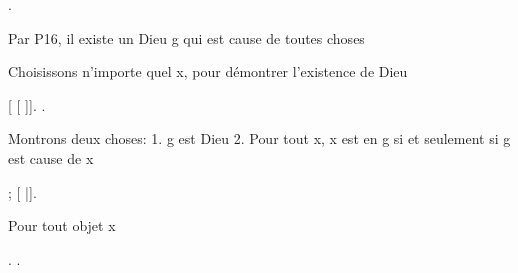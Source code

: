 \documentclass[10pt]{report}
\begin{document}
\begin{coqdoccode}
\coqdocnoindent
{}.\coqdoceol
\coqdocindent{1.00em}
\begin{coqdoccomment}
\coqdocindent{0.50em}
Par\coqdocindent{0.50em}
P16,\coqdocindent{0.50em}
il\coqdocindent{0.50em}
existe\coqdocindent{0.50em}
un\coqdocindent{0.50em}
Dieu\coqdocindent{0.50em}
g\coqdocindent{0.50em}
qui\coqdocindent{0.50em}
est\coqdocindent{0.50em}
cause\coqdocindent{0.50em}
de\coqdocindent{0.50em}
toutes\coqdocindent{0.50em}
choses\coqdocindent{0.50em}
\end{coqdoccomment}
\coqdoceol
\coqdocindent{1.00em}
\begin{coqdoccomment}
\coqdocindent{0.50em}
Choisissons\coqdocindent{0.50em}
n'importe\coqdocindent{0.50em}
quel\coqdocindent{0.50em}
x,\coqdocindent{0.50em}
pour\coqdocindent{0.50em}
démontrer\coqdocindent{0.50em}
l'existence\coqdocindent{0.50em}
de\coqdocindent{0.50em}
Dieu\coqdocindent{0.50em}
\end{coqdoccomment}
\coqdoceol
\coqdocindent{1.00em}
   [ [ \coqdocvar{\_}]].\coqdoceol
\coqdocindent{1.00em}
\coqdoctac{\ensuremath{\exists}} .\coqdoceol
\coqdocemptyline
\coqdocindent{1.00em}
\begin{coqdoccomment}
\coqdocindent{0.50em}
Montrons\coqdocindent{0.50em}
deux\coqdocindent{0.50em}
choses:\coqdoceol
\coqdocindent{2.50em}
1.\coqdocindent{0.50em}
g\coqdocindent{0.50em}
est\coqdocindent{0.50em}
Dieu\coqdoceol
\coqdocindent{2.50em}
2.\coqdocindent{0.50em}
Pour\coqdocindent{0.50em}
tout\coqdocindent{0.50em}
x,\coqdocindent{0.50em}
x\coqdocindent{0.50em}
est\coqdocindent{0.50em}
en\coqdocindent{0.50em}
g\coqdocindent{0.50em}
si\coqdocindent{0.50em}
et\coqdocindent{0.50em}
seulement\coqdocindent{0.50em}
si\coqdocindent{0.50em}
g\coqdocindent{0.50em}
est\coqdocindent{0.50em}
cause\coqdocindent{0.50em}
de\coqdocindent{0.50em}
x\coqdocindent{0.50em}
\end{coqdoccomment}
\coqdoceol
\coqdocindent{1.00em}
; [ |].\coqdoceol
\coqdocemptyline
\coqdocindent{1.00em}
\begin{coqdoccomment}
\coqdocindent{0.50em}
Pour\coqdocindent{0.50em}
tout\coqdocindent{0.50em}
objet\coqdocindent{0.50em}
x\coqdocindent{0.50em}
\end{coqdoccomment}
\coqdoceol
\coqdocindent{1.00em}
 .\coqdoceol
\coqdocindent{1.00em}
.\coqdoceol
\coqdocemptyline
\coqdocindent{1.00em}
\begin{coqdoccomment}

\end{coqdoccomment}
\end{coqdoccode}
\end{document}
